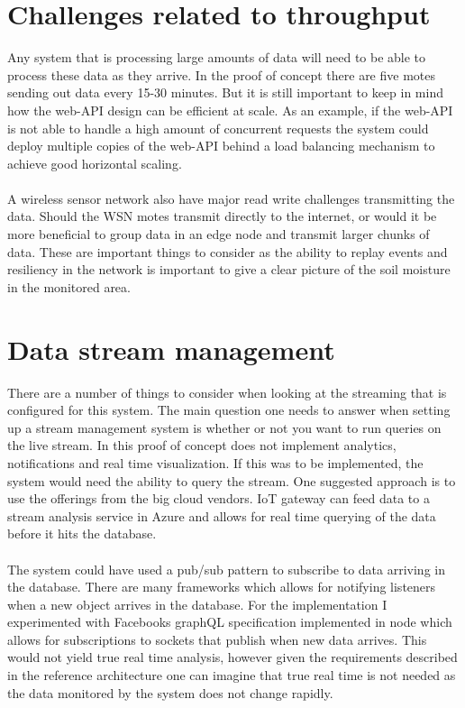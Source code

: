 \documentclass[]{uiophd}
\begin{document}
\section{Challenges related to throughput}

Any system that is processing large amounts of data will need to be able to process these data as they arrive. In the proof of concept there are five motes sending out data every 15-30 minutes. But it is still important to keep in mind how the web-API design can be efficient at scale. As an example, if the web-API is not able to handle a high amount of concurrent requests the system could deploy multiple copies of the web-API behind a load balancing mechanism to achieve good horizontal scaling.
\\\\
A wireless sensor network also have major read write challenges transmitting the data. Should the WSN motes transmit directly to the internet, or would it be more beneficial to group data in an edge node and transmit larger chunks of data. These are important things to consider as the ability to replay events and resiliency in the network is important to give a clear picture of the soil moisture in the monitored area.

\section{Data stream management}
There are a number of things to consider when looking at the streaming that is configured for this system. The main question one needs to answer when setting up a stream management system is whether or not you want to run queries on the live stream. In this proof of concept does not implement analytics, notifications and real time visualization. If this was to be implemented, the system would need the ability to query the stream. One suggested approach is to use the offerings from the big cloud vendors. IoT gateway can feed data to a stream analysis service in Azure and allows for real time querying of the data before it hits the database.
\\\\
The system could have used a pub/sub pattern to subscribe to data arriving in the database. There are many frameworks which allows for notifying listeners when a new object arrives in the database. For the implementation I experimented with Facebooks graphQL specification implemented in node which allows for subscriptions to sockets that publish when new data arrives. This would not yield true real time analysis, however given the requirements described in the reference architecture one can imagine that true real time is not needed as the data monitored by the system does not change rapidly.
\end{document}
